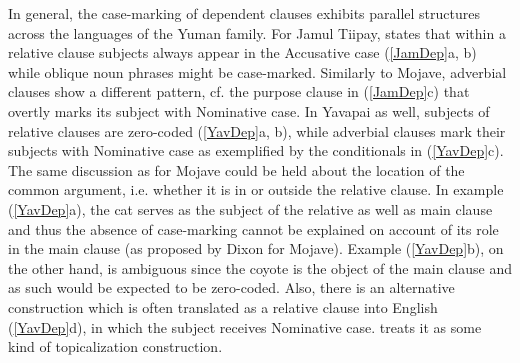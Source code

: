 In general, the case-marking of dependent clauses exhibits parallel structures across the languages of the Yuman family.
For {Jamul Tiipay}, \citet[210]{Miller:2001} states that within a relative clause subjects always appear in the Accusative case (\ref{JamDep}a, b) while oblique noun phrases might be case-marked. 
Similarly to Mojave, adverbial clauses show a different pattern, cf. the purpose clause in (\ref{JamDep}c) that overtly marks its subject with Nominative  case.
In Yavapai as well, subjects of  relative clauses are zero-coded (\ref{YavDep}a, b), while adverbial clauses mark their subjects with Nominative  case as exemplified by the conditionals in (\ref{YavDep}c). 
The same discussion as for Mojave could be held about the location of the common argument, i.e. whether it is in or outside the relative clause. 
In example (\ref{YavDep}a), the cat serves as the subject of the relative as well as main clause and thus the absence of case-marking cannot be explained on account of its role in the main clause (as proposed by Dixon for Mojave). 
Example (\ref{YavDep}b), on the other hand, is ambiguous since the coyote is the object of the main clause and as such would be expected to be zero-coded. 
Also, there is an alternative construction which is often translated as a relative clause into English (\ref{YavDep}d), in which the subject receives Nominative  case. \citet[221]{Kendall:1976} treats it as some kind of topicalization construction.

